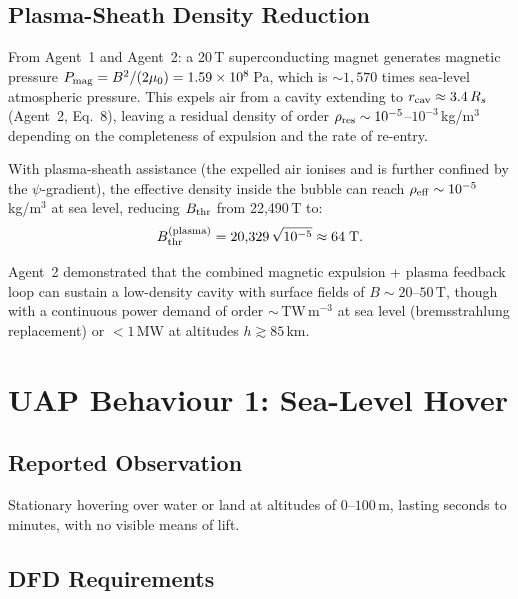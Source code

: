 \documentclass[12pt,a4paper]{article}
\begin{document}
\subsection{Plasma-Sheath Density Reduction}

From Agent~1 and Agent~2: a 20\,T superconducting magnet generates magnetic
pressure $P_{\rm mag} = B^2/(2\mu_0) = 1.59\times 10^8$\,Pa, which is $\sim 1{,}570$
times sea-level atmospheric pressure.  This expels air from a cavity extending
to $r_{\rm cav} \approx 3.4\,R_s$ (Agent~2, Eq.~8), leaving a residual density
of order $\rho_{\rm res} \sim 10^{-5}$--$10^{-3}$\,kg/m$^3$ depending on the
completeness of expulsion and the rate of re-entry.

With plasma-sheath assistance (the expelled air ionises and is further
confined by the $\psi$-gradient), the effective density inside the bubble
can reach $\rho_{\rm eff} \sim 10^{-5}$\,kg/m$^3$ at sea level,
reducing $B_{\rm thr}$ from 22{,}490\,T to:
\begin{equation}
B_{\rm thr}^{\rm (plasma)} = 20{,}329\,\sqrt{10^{-5}} \approx 64\;\text{T.}
\end{equation}

Agent~2 demonstrated that the combined magnetic expulsion + plasma feedback
loop can sustain a low-density cavity with surface fields of
$B \sim 20$--$50$\,T, though with a continuous power demand of order
$\sim$\,TW\,m$^{-3}$ at sea level (bremsstrahlung replacement) or
$< 1$\,MW at altitudes $h \gtrsim 85$\,km.


\section{UAP Behaviour 1: Sea-Level Hover}\label{sec:hover}

\subsection{Reported Observation}

Stationary hovering over water or land at altitudes of $0$--$100$\,m,
lasting seconds to minutes, with no visible means of lift.

\subsection{DFD Requirements}
\end{document}
